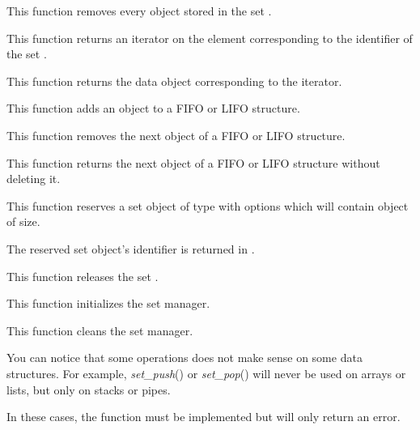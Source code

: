 	 {
	   This function removes every object stored in the set
	   .
	 }

	 {
	   This function returns an iterator on the element corresponding
	   to the identifier  of the set .
	 }

	 {
	   This function returns the data object corresponding to
	   the iterator.
	 }

	 {
	   This function adds an object to a FIFO or LIFO structure.
	 }

	 {
	   This function removes the next object of a FIFO or LIFO structure.
	 }

	 {
	   This function returns the next object of a FIFO or LIFO structure
	   without deleting it.
	 }

	 {
	   This function reserves a set object of type 
	   with options  which will contain object of
	    size.

	   The reserved set object's identifier is returned in
	   .
	 }

	 {
	   This function releases the set .
	 }

	 {
	   This function initializes the set manager.
	 }

	 {
	   This function cleans the set manager.
	 }

You can notice that some operations does not make sense on some data
structures. For example, \textit{set\_push}() or \textit{set\_pop}()
will never be used on arrays or lists, but only on stacks or pipes.

In these cases, the function must be implemented but will only return
an error.

